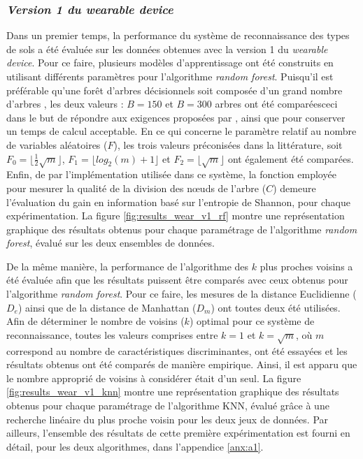 \subsubsection{\textit{Version 1 du wearable device}}

Dans un premier temps, la performance du système de reconnaissance des types de sols a été évaluée sur les données obtenues avec la version 1 du \textit{wearable device}. Pour ce faire, plusieurs modèles d'apprentissage ont été construits en utilisant différents paramètres pour l'algorithme \textit{random forest}. Puisqu'il est préférable qu'une forêt d'arbres décisionnels soit composée d'un grand nombre d'arbres \citep{Breiman2001}, les deux valeurs : $B=150$ et $B=300$ arbres ont été comparées\textemdash ceci dans le but de répondre aux exigences proposées par \cite{Breiman2001}, ainsi que pour conserver un temps de calcul acceptable. En ce qui concerne le paramètre relatif au nombre de variables aléatoires ($F$), les trois valeurs préconisées dans la littérature, soit $F_0=\lfloor \frac{1}{2}\sqrt{m}\rfloor$, $F_1=\lfloor log_2(m) + 1\rfloor$ et $F_2=\lfloor \sqrt{m}\rfloor$ ont également été comparées. Enfin, de par l'implémentation utilisée dans ce système, la fonction employée pour mesurer la qualité de la division des n\oe{}uds de l'arbre ($C$) demeure l’évaluation du gain en information basé sur l’entropie de Shannon, pour chaque expérimentation. La figure \ref{fig:results_wear_v1_rf} montre une représentation graphique des résultats obtenus pour chaque paramétrage de l'algorithme \textit{random forest}, évalué sur les deux ensembles de données.

De la même manière, la performance de l'algorithme des $k$ plus proches voisins a été évaluée afin que les résultats puissent être comparés avec ceux obtenus pour l'algorithme \textit{random forest}. Pour ce faire, les mesures de la distance Euclidienne ($D_e$) ainsi que de la distance de Manhattan ($D_m$) ont toutes deux été utilisées. Afin de déterminer le nombre de voisins ($k$) optimal pour ce système de reconnaissance, toutes les valeurs comprises entre $k=1$ et $k=\sqrt{m}$, où $m$ correspond au nombre de caractéristiques discriminantes, ont été essayées et les résultats obtenus ont été comparés de manière empirique. Ainsi, il est apparu que le nombre approprié de voisins à considérer était d'un seul. La figure \ref{fig:results_wear_v1_knn} montre une représentation graphique des résultats obtenus pour chaque paramétrage de l'algorithme \acs{KNN}, évalué grâce à une recherche linéaire du plus proche voisin pour les deux jeux de données. Par ailleurs, l'ensemble des résultats de cette première expérimentation est fourni en détail, pour les deux algorithmes, dans l'appendice \ref{anx:a1}.

